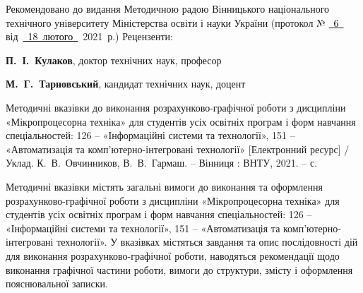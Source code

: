 \pagestyle{empty}
Рекомендовано до видання Методичною радою Вінницького національного технічного університету Міністерства освіти і науки України (протокол № \underline{\textcolor{black}{~6~}} від~\underline{\textcolor{black}{~18~лютого~}}~2021~р.)
\vfill
Рецензенти:\par
\textbf{П.~І.~Кулаков}, доктор технічних наук, професор\par
\textbf{М.~Г.~Тарновський}, кандидат технічних наук, доцент\par
\vfill
Методичні вказівки до виконання розрахунково-графічної роботи з дисципліни «Мікропроцесорна техніка» для студентів усіх освітніх програм і форм навчання спеціальностей: 126 -- «Інформаційні системи та технології», 151 -- «Автоматизація та комп’ютерно-інтегровані технології» [Електронний ресурс] / Уклад. К.~В.~Овчинников, В.~В.~Гармаш. -- Вінниця : ВНТУ, 2021. -- \pageref{LastPage} с.

{\small Методичні вказівки містять загальні вимоги до виконання та оформлення розрахунково-графічної роботи з дисципліни «Мікропроцесорна техніка» для студентів усіх освітніх програм і форм навчання спеціальностей: 126 -- «Інформаційні системи та технології», 151 -- «Автоматизація та комп’ютерно-інтегровані технології». У вказівках містяться завдання та опис послідовності дій для виконання розрахунково-графічної роботи, наводяться рекомендації щодо виконання графічної частини роботи, вимоги до структури, змісту і оформлення пояснювальної записки.}
\vfill
\vfill
\vfill

\newpage